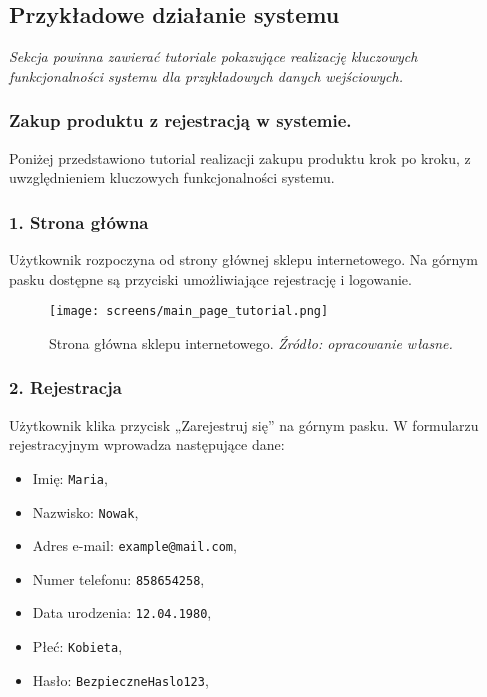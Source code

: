 \documentclass[12pt,a4paper,oneside]{article}
\theoremstyle{definition}
\numberwithin{equation}{section}
\begin{document}
\newpage
\subsection{Przykładowe działanie systemu}
\textit{Sekcja powinna zawierać tutoriale pokazujące realizację kluczowych funkcjonalności systemu dla przykładowych danych wejściowych.}



\subsubsection{Zakup produktu z rejestracją w systemie.}
Poniżej przedstawiono tutorial realizacji zakupu produktu krok po kroku, z uwzględnieniem kluczowych funkcjonalności systemu.

\subsubsection*{\textbf{1. Strona główna}}
Użytkownik rozpoczyna od strony głównej sklepu internetowego. Na górnym pasku dostępne są przyciski umożliwiające rejestrację i logowanie.

\begin{figure}[H]
    \centering
    \texttt{[image: screens/main\_page\_tutorial.png]}
    \caption{Strona główna sklepu internetowego. \emph{Źródło: opracowanie własne.}}
    \label{fig:main_page_tutorial}
\end{figure}

\subsubsection*{\textbf{2. Rejestracja}}
Użytkownik klika przycisk „Zarejestruj się” na górnym pasku. W formularzu rejestracyjnym wprowadza następujące dane:
\begin{itemize}
    \item Imię: \texttt{Maria},
    \item Nazwisko: \texttt{Nowak},
    \item Adres e-mail: \texttt{example@mail.com},
    \item Numer telefonu: \texttt{858654258},
    \item Data urodzenia: \texttt{12.04.1980},
    \item Płeć: \texttt{Kobieta},
    \item Hasło: \texttt{BezpieczneHaslo123},
\end{itemize}
\end{document}
